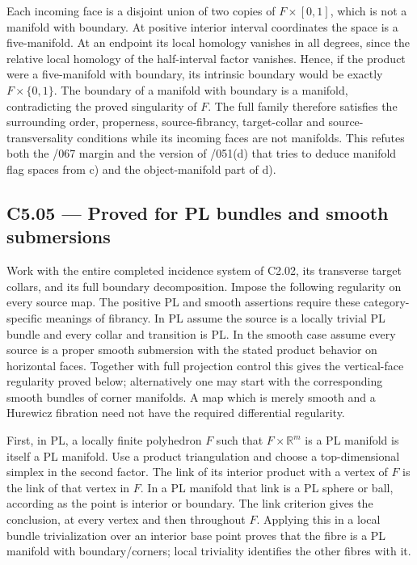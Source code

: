 Each incoming face is a disjoint union of two copies of \(F\times[0,1]\), which is not a manifold with boundary. At positive interior interval coordinates the space is a five-manifold. At an endpoint its local homology vanishes in all degrees, since the relative local homology of the half-interval factor vanishes. Hence, if the product were a five-manifold with boundary, its intrinsic boundary would be exactly \(F\times\{0,1\}\). The boundary of a manifold with boundary is a manifold, contradicting the proved singularity of \(F\). The full family therefore satisfies the surrounding order, properness, source-fibrancy, target-collar and source-transversality conditions while its incoming faces are not manifolds. This refutes both the /067 margin and the version of /051(d) that tries to deduce manifold flag spaces from c) and the object-manifold part of d).

\subsection{C5.05 --- Proved for PL bundles and smooth submersions}\label{c5.05-proved-for-pl-bundles-and-smooth-submersions}

Work with the entire completed incidence system of C2.02, its transverse target collars, and its full boundary decomposition. Impose the following regularity on every source map. The positive PL and smooth assertions require these category-specific meanings of fibrancy. In PL assume the source is a locally trivial PL bundle and every collar and transition is PL. In the smooth case assume every source is a proper smooth submersion with the stated product behavior on horizontal faces. Together with full projection control this gives the vertical-face regularity proved below; alternatively one may start with the corresponding smooth bundles of corner manifolds. A map which is merely smooth and a Hurewicz fibration need not have the required differential regularity.

First, in PL, a locally finite polyhedron \(F\) such that \(F\times\mathbb R^m\) is a PL manifold is itself a PL manifold. Use a product triangulation and choose a top-dimensional simplex in the second factor. The link of its interior product with a vertex of \(F\) is the link of that vertex in \(F\). In a PL manifold that link is a PL sphere or ball, according as the point is interior or boundary. The link criterion gives the conclusion, at every vertex and then throughout \(F\). Applying this in a local bundle trivialization over an interior base point proves that the fibre is a PL manifold with boundary/corners; local triviality identifies the other fibres with it.

